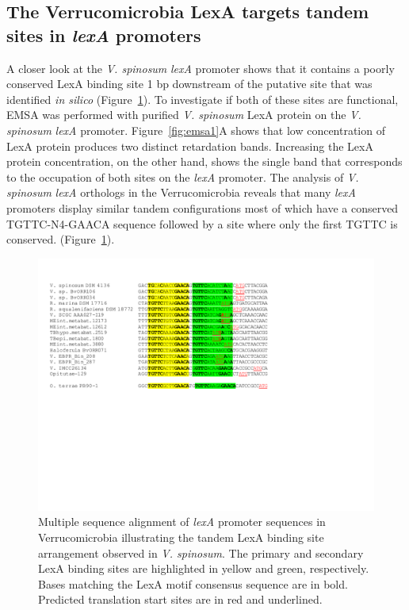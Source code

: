 \subsection{The Verrucomicrobia LexA targets tandem sites in \textit{lexA}
  promoters}

A closer look at the \textit{V. spinosum} \textit{lexA} promoter shows that it
contains a poorly conserved LexA binding site 1 bp downstream of the putative
site that was identified \textit{in silico} (Figure~\ref{fig:lexa-tandem}). To
investigate if both of these sites are functional, EMSA was performed with
purified \textit{V. spinosum} LexA protein on the \textit{V. spinosum}
\textit{lexA} promoter. Figure~\ref{fig:emsa1}A shows that low concentration of
LexA protein produces two distinct retardation bands. Increasing the LexA
protein concentration, on the other hand, shows the single band that
corresponds to the occupation of both sites on the \textit{lexA} promoter. The
analysis of \textit{V. spinosum} \textit{lexA} orthologs in the Verrucomicrobia
reveals that many \textit{lexA} promoters display similar tandem configurations
most of which have a conserved TGTTC-N4-GAACA sequence followed by a site where
only the first TGTTC is conserved. (Figure~\ref{fig:lexa-tandem}).

\begin{figure}
  \centering
  \includegraphics[width=\textwidth]{figures/chapter5/tandem}
  \caption[Multiple sequence alignment of \textit{lexA} promoter sequences in
  Verrucomicrobia.]{Multiple sequence alignment of \textit{lexA} promoter
    sequences in Verrucomicrobia illustrating the tandem LexA binding site
    arrangement observed in \textit{V. spinosum}. The primary and secondary
    LexA binding sites are highlighted in yellow and green, respectively. Bases
    matching the LexA motif consensus sequence are in bold. Predicted
    translation start sites are in red and underlined.}
  \label{fig:lexa-tandem}
\end{figure}

